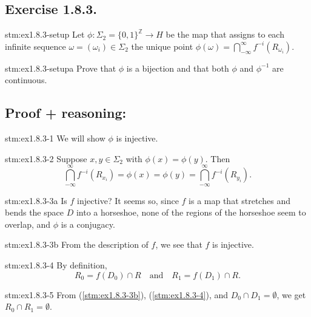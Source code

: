 \subsection*{Exercise 1.8.3.}

\begin{exercise}{stm:ex1.8.3-setup}
Let $\phi : \Sigma_2 = \{0,1\}^{\mathbb{Z}} \to H$ be the map that assigns to each infinite sequence $\omega = (\omega_i) \in \Sigma_2$ the unique point $\phi(\omega) = \bigcap_{-\infty}^\infty f^{-i}(R_{\omega_i})$.
\end{exercise}

\begin{exercise}{stm:ex1.8.3-setupa}
Prove that $\phi$ is a bijection and that both $\phi$ and $\phi^{-1}$ are continuous.
\end{exercise}

\subsection*{Proof {\color{blue} + reasoning}:}

\begin{explanation}{stm:ex1.8.3-1}
We will show $\phi$ is injective.
\end{explanation}

\begin{statement}{stm:ex1.8.3-2}
Suppose $x, y \in \Sigma_2$ with $\phi(x) = \phi(y)$. Then 
\[
\bigcap_{-\infty}^\infty f^{-i}(R_{x_i}) = \phi(x) = \phi(y) = \bigcap_{-\infty}^\infty f^{-i}(R_{y_i}).
\]
\end{statement}

\begin{explanation}{stm:ex1.8.3-3a}
Is $f$ injective? It seems so, since $f$ is a map that stretches and bends the space $D$ into a horseshoe, none of the regions of the horseshoe seem to overlap, and $\phi$ is a conjugacy.
\end{explanation}

\begin{statement}{stm:ex1.8.3-3b}
From the description of $f$, we see that $f$ is injective.
\end{statement}

\begin{statement}{stm:ex1.8.3-4}
By definition,
\[
R_0 = f(D_0) \cap R \quad \text{and} \quad R_1 = f(D_1) \cap R.
\]
\end{statement}

\begin{statement}{stm:ex1.8.3-5}
From (\ref{stm:ex1.8.3-3b}), (\ref{stm:ex1.8.3-4}), and $D_0 \cap D_1 = \emptyset$, we get $R_0 \cap R_1 = \emptyset$.
\end{statement}

